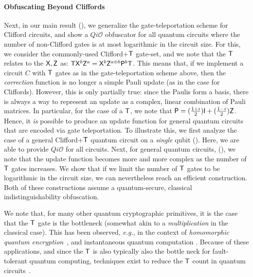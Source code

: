 \paragraph{Obfuscating Beyond Cliffords} Next, in our main result (), we generalize the gate-teleportation scheme for Clifford circuits, and show a $Qi\mathcal{O}$ obfuscator for all quantum circuits where the number of non-Clifford  gates is at most logarithmic in the circuit size. For this, we consider the commonly-used Clifford+${\sf T}$ gate-set, and we note that the ${\sf T}$ relates to the ${\sf X}, {\sf Z}$ as: ${\sf T} {\sf X}^b {\sf Z}^a={\sf X}^b {\sf Z}^{a\oplus b}{\sf P}^b {\sf T}$. This means that, if we implement a circuit $C$ with ${\sf T}$ gates as in the gate-teleportation scheme above, then the \emph{correction} function is no longer a simple Pauli update (as in the case for Cliffords). However, this is only partially true: since the Paulis form a basis, there is always a way to represent an update as a complex, linear combination of Pauli matrices. In particular, for the case of a ${\sf T}$, we note that ${\sf P}=(\frac{1+i}{2}) {\sf I} + (\frac{1-i}{2}){\sf Z}$. Hence, it \emph{is} possible to produce an update function for general quantum circuits that are encoded via gate teleportation. To illustrate this, we first analyze the case of a general Clifford+${\sf T}$ quantum circuit on a \emph{single} qubit (). Here, we are able to provide $Qi\mathcal{O}$ for all circuits. Next, for general quantum circuits, (), we note that the update function becomes more and more complex as the number of ${\sf T}$ gates increases. We show that if we limit the number of ${\sf T}$ gates to be logarithmic in the circuit size, we can nevertheless reach an efficient construction. Both of these constructions assume a quantum-secure, classical indistinguishability obfuscation. 


We note that,  for many other quantum cryptographic primitives, it is the case that the ${\sf T}$ gate is the bottleneck (somewhat akin to a \emph{multiplication} in the classical case). This has been observed, \emph{e.g.}, in the context of \emph{homomorphic quantum encryption}~\cite{BJ15}, and instantaneous quantum computation \cite{Spel16}.
Because of these applications, and since the ${\sf T}$ is also typically also the bottle neck for fault-tolerant quantum computing, techniques exist to reduce the ${\sf T}$ count in quantum circuits~\cite{AMMR13,DMM16,AMM14}.



